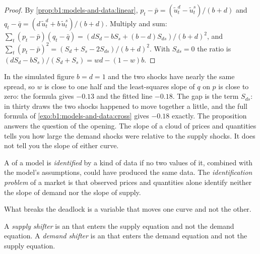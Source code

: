 \begin{proof}
By \cref{prop:b1:models-and-data:linear}, $p_t - \bar p = (\tilde u^d_t -
\tilde u^s_t)/(b + d)$ and $q_t - \bar q = (d\,\tilde u^d_t + b\,\tilde
u^s_t)/(b + d)$. Multiply and sum:
$\sum_t (p_t - \bar p)(q_t - \bar q) = (d S_d - b S_s + (b - d)S_{ds})/(b +
d)^2$, and $\sum_t (p_t - \bar p)^2 = (S_d + S_s - 2S_{ds})/(b + d)^2$. With
$S_{ds} = 0$ the ratio is $(d S_d - b S_s)/(S_d + S_s) = w d - (1 - w) b$.
\end{proof}

In the simulated figure $b = d = 1$ and the two shocks have nearly the same
spread, so $w$ is close to one half and the least-squares slope of $q$ on $p$
is close to zero: the
formula gives $-0.13$ and the fitted line $-0.18$. %
The gap is the term $S_{ds}$: in thirty draws the two shocks happened to
move together a little, and the full formula of
\cref{exo:b1:models-and-data:cross} gives $-0.18$ exactly. %
The proposition answers the question of the opening. The slope of a cloud
of prices and quantities tells you how large the demand shocks were
relative to the supply shocks. It does not tell you the slope of either
curve.

\begin{definition}\label{def:b1:models-and-data:identification}
A  of a model is \emph{identified} by a kind of data if no two
values of it, combined with the model's assumptions, could have produced
the same data. The \emph{identification problem} of a market is that
observed  prices and quantities alone identify neither the slope
of demand nor the slope of supply.
\end{definition}

What breaks the deadlock is a variable that moves one curve and not the
other.

\begin{definition}[Shifter]\label{def:b1:models-and-data:shifter}
A \emph{supply shifter} is an  that enters the supply
equation and not the demand equation. A \emph{demand shifter} is an
 that enters the demand equation and not the supply
equation.
\end{definition}

